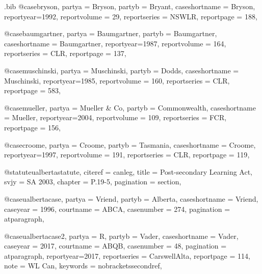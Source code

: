 \begin{filecontents*}[overwrite]{\jobname.bib}
@case{bryson,
  partya = {Bryson}, 
  partyb = {Bryant},
  caseshortname = {Bryson},
  reportyear={1992},
  reportvolume = {29},
  reportseries = {NSWLR},
  reportpage = {188},
	}





@case{baumgartner,
  partya = {Baumgartner}, 
  partyb = {Baumgartner},
  caseshortname = {Baumgartner},
  reportyear={1987},
  reportvolume = {164},
  reportseries = {CLR},
  reportpage = {137},
	}




@case{muschinski,
  partya = {Muschinski}, 
  partyb = {Dodds},
  caseshortname = {Muschinski},
  reportyear={1985},
  reportvolume = {160},
  reportseries = {CLR},
  reportpage = {583},
	}


@case{mueller,
  partya = {Mueller \& Co}, 
  partyb = {Commonwealth},
  caseshortname = {Mueller},
  reportyear={2004},
  reportvolume = {109},
  reportseries = {FCR},
  reportpage = {156},
	}


@case{croome,
  partya = {Croome}, 
  partyb = {Tasmania},
  caseshortname = {Croome},
  reportyear={1997},
  reportvolume = {191},
  reportseries = {CLR},
  reportpage = {119},
	}



@statute{ualbertastatute,
citeref = {canleg},
title = {Post-secondary Learning Act},
svjy = {SA 2003},
chapter = {P.19-5},
pagination = {section},
}

@case{ualbertacase,
  partya = {Vriend}, 
  partyb = {Alberta},
  caseshortname = {Vriend},
  caseyear = {1996},
  courtname = {ABCA},
  casenumber = {274},
  pagination = {atparagraph},
	}


@case{ualbertacase2,
  partya = {R}, 
  partyb = {Vader},
  caseshortname = {Vader},
  caseyear = {2017},
  courtname = {ABQB},
  casenumber = {48},
  pagination = {atparagraph},
  reportyear={2017},
  reportseries = {CarswellAlta},
  reportpage = {114},
  note = {WL Can},
  keywords = {nobracketssecondref},
}



\end{filecontents*}
